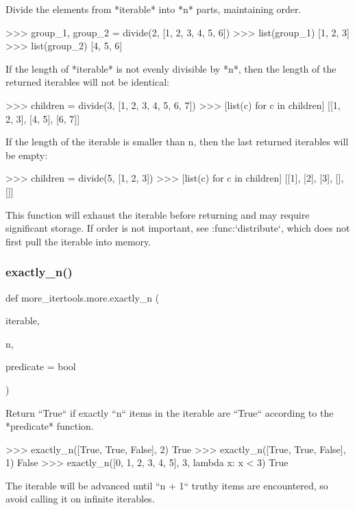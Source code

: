 \begin{DoxyVerb}Divide the elements from *iterable* into *n* parts, maintaining
order.

    >>> group_1, group_2 = divide(2, [1, 2, 3, 4, 5, 6])
    >>> list(group_1)
    [1, 2, 3]
    >>> list(group_2)
    [4, 5, 6]

If the length of *iterable* is not evenly divisible by *n*, then the
length of the returned iterables will not be identical:

    >>> children = divide(3, [1, 2, 3, 4, 5, 6, 7])
    >>> [list(c) for c in children]
    [[1, 2, 3], [4, 5], [6, 7]]

If the length of the iterable is smaller than n, then the last returned
iterables will be empty:

    >>> children = divide(5, [1, 2, 3])
    >>> [list(c) for c in children]
    [[1], [2], [3], [], []]

This function will exhaust the iterable before returning and may require
significant storage. If order is not important, see :func:`distribute`,
which does not first pull the iterable into memory.\end{DoxyVerb}
 \mbox{\label{namespacemore__itertools_1_1more_a2965e4ada7a3250d4580918778305a40}} 
\subsubsection{\texorpdfstring{exactly\+\_\+n()}{exactly\_n()}}
{\footnotesize\ttfamily def more\+\_\+itertools.\+more.\+exactly\+\_\+n (\begin{DoxyParamCaption}\item[{}]{iterable,  }\item[{}]{n,  }\item[{}]{predicate = {\ttfamily bool} }\end{DoxyParamCaption})}

\begin{DoxyVerb}Return ``True`` if exactly ``n`` items in the iterable are ``True``
according to the *predicate* function.

    >>> exactly_n([True, True, False], 2)
    True
    >>> exactly_n([True, True, False], 1)
    False
    >>> exactly_n([0, 1, 2, 3, 4, 5], 3, lambda x: x < 3)
    True

The iterable will be advanced until ``n + 1`` truthy items are encountered,
so avoid calling it on infinite iterables.\end{DoxyVerb}
 \mbox{\label{namespacemore__itertools_1_1more_a11b798d0988ce255f2c16ed2d0ccedd4}} 

